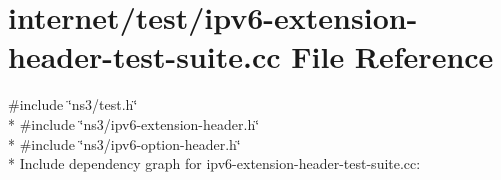 \hypertarget{ipv6-extension-header-test-suite_8cc}{}\section{internet/test/ipv6-\/extension-\/header-\/test-\/suite.cc File Reference}
\label{ipv6-extension-header-test-suite_8cc}
{\ttfamily \#include \char`\"{}ns3/test.\+h\char`\"{}}\\*
{\ttfamily \#include \char`\"{}ns3/ipv6-\/extension-\/header.\+h\char`\"{}}\\*
{\ttfamily \#include \char`\"{}ns3/ipv6-\/option-\/header.\+h\char`\"{}}\\*
Include dependency graph for ipv6-\/extension-\/header-\/test-\/suite.cc\+:
